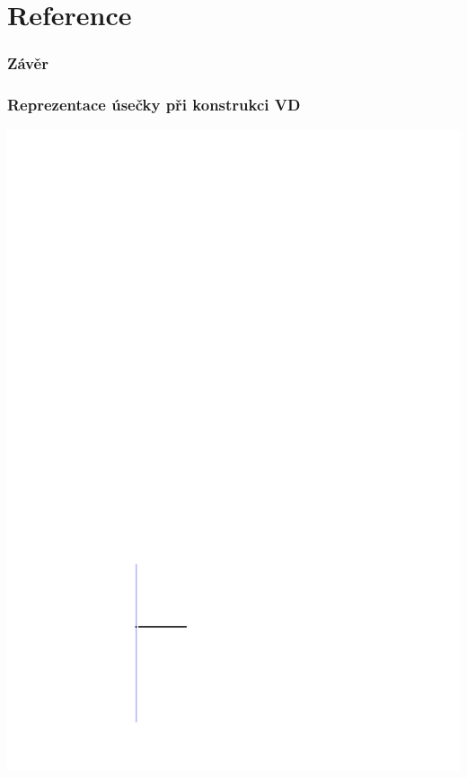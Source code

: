 \documentclass[notes=false,pdftex]{beamer}
\begin{document}
\section{Reference}
\begin{frame}
	\frametitle{Závěr}

	
	
	
\end{frame}


\begin{frame}[label=VDdetail]
	\frametitle{Reprezentace úsečky při konstrukci VD}
	\includegraphics[height=1\textheight,clip=true,trim=150pt 167pt 409pt 642pt]{images/line_segment-01-endpoint_and_rest_of_line.pdf} 
\end{frame}
\end{document}
